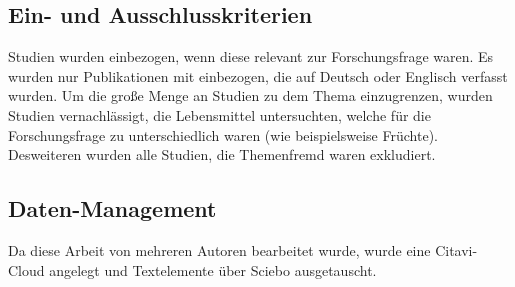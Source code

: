 \documentclass[a4paper,12pt]{article}
\begin{document}
\subsection{Ein- und Ausschlusskriterien}
Studien wurden einbezogen, wenn diese relevant zur Forschungsfrage waren. Es wurden nur Publikationen mit einbezogen, die auf Deutsch oder Englisch verfasst wurden. Um die große Menge an Studien zu dem Thema einzugrenzen, wurden Studien vernachlässigt, die Lebensmittel untersuchten, welche für die Forschungsfrage zu unterschiedlich waren (wie beispielsweise Früchte). Desweiteren wurden alle Studien, die Themenfremd waren exkludiert.

\subsection{Daten-Management}
Da diese Arbeit von mehreren Autoren bearbeitet wurde, wurde eine Citavi-Cloud angelegt und Textelemente über Sciebo ausgetauscht.

\pagebreak
\end{document}
